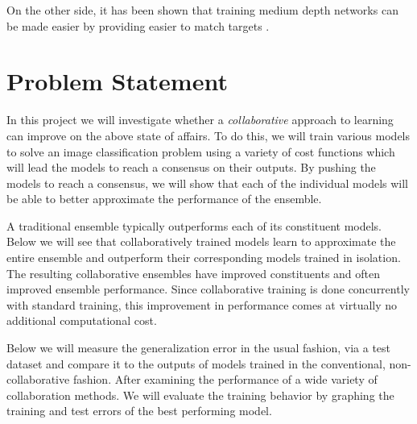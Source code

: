 \documentclass[english,a4paper,oneside]{amsart}
\theoremstyle{definition}
\begin{document}
On the other side, it has been shown that training medium depth networks can be made easier by providing easier to match targets \cite{Curriculum, FitNet}.


\section{Problem Statement}


In this project we will investigate whether a \emph{collaborative} approach to learning can improve on the above state of affairs. To do this, we will train various models to solve an image classification problem using a variety of cost functions which will lead the models to reach a consensus on their outputs. By pushing the models to reach a consensus, we will show that each of the individual models will be able to better approximate the performance of the ensemble. 

A traditional ensemble typically outperforms each of its constituent models. Below we will see that collaboratively trained models learn to approximate the entire ensemble and outperform their corresponding models trained in isolation. The resulting collaborative ensembles have improved constituents and often improved ensemble performance. Since collaborative training is done concurrently with standard training, this improvement in performance comes at virtually no additional computational cost. %

Below we will measure the generalization error in the usual fashion, via a test dataset and compare it to the outputs of models trained in the conventional, non-collaborative fashion. After examining the performance of a wide variety of collaboration methods. We will evaluate the training behavior by graphing the training and test errors of the best performing model.
\end{document}
